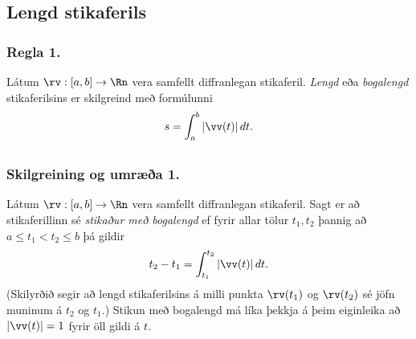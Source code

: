 \subsection{Lengd stikaferils}
\subsubsection{Regla 1.}
Látum $\rv:  [a,b]\rightarrow \Rn$ vera samfellt diffranlegan stikaferil.  {\em Lengd} eða 
{\em bogalengd} stikaferilsins er skilgreind með formúlunni 
$$s=\int_a^b |\vv(t)|\,dt.$$



\subsection{}

\subsubsection{Skilgreining og umræða 1.}
Látum $\rv: [a,b]\rightarrow \Rn$ vera samfellt diffranlegan stikaferil.   Sagt er að
stikaferillinn sé {\em stikaður með  bogalengd} ef fyrir allar tölur $t_1,
t_2$ þannig að $a\leq t_1<t_2\leq b$ þá gildir 
$$t_2-t_1= \int_{t_1}^{t_2} |\vv(t)|\,dt.$$
(Skilyrðið segir að lengd stikaferilsins á milli punkta $\rv(t_1)$ og
$\rv(t_2)$ sé jöfn muninum á $t_2$ og $t_1$.)
Stikun með bogalengd má líka þekkja á þeim eiginleika að $|\vv(t)|=1$ fyrir öll gildi á $t$.






